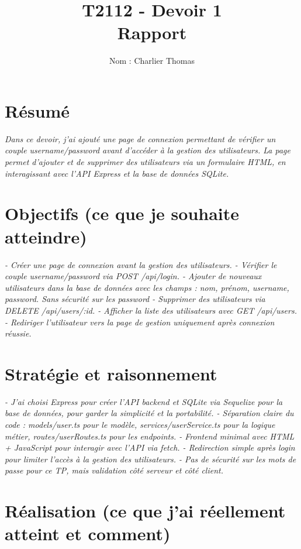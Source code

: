 \documentclass[11pt,a4paper]{article}
\title{T2112 - Devoir 1 \\Rapport}
\author{Nom : Charlier Thomas }
\begin{document}
\maketitle
\tableofcontents
\bigskip

\section*{Résumé}

\textit{Dans ce devoir, j'ai ajouté une page de connexion permettant de vérifier un couple username/password avant d'accéder à la gestion des utilisateurs. La page permet d'ajouter et de supprimer des utilisateurs via un formulaire HTML, en interagissant avec l'API Express et la base de données SQLite.}






\section{Objectifs (ce que je souhaite atteindre)}
\textit{
- Créer une page de connexion avant la gestion des utilisateurs.
- Vérifier le couple username/password via POST /api/login.
- Ajouter de nouveaux utilisateurs dans la base de données avec les champs : nom, prénom, username, password. Sans sécurité sur les password
- Supprimer des utilisateurs via DELETE /api/users/:id.
- Afficher la liste des utilisateurs avec GET /api/users.
- Rediriger l'utilisateur vers la page de gestion uniquement après connexion réussie.
}





\section{Stratégie et raisonnement}
\textit{
- J'ai choisi Express pour créer l'API backend et SQLite via Sequelize pour la base de données, pour garder la simplicité et la portabilité.
- Séparation claire du code : models/user.ts pour le modèle, services/userService.ts pour la logique métier, routes/userRoutes.ts pour les endpoints.
- Frontend minimal avec HTML + JavaScript pour interagir avec l'API via fetch.
- Redirection simple après login pour limiter l'accès à la gestion des utilisateurs.
- Pas de sécurité sur les mots de passe pour ce TP, mais validation côté serveur et côté client.
}





\section{Réalisation (ce que j'ai réellement atteint et comment)}
\end{document}
